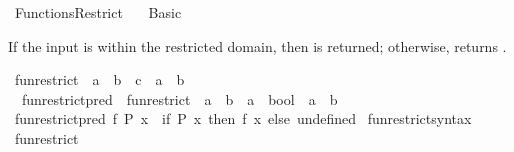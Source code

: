 %
\begin{isabellebody}%
%
%
\isadelimtheory
%
\endisadelimtheory
%
\isatagtheory
\isanewline
{}\isamarkupfalse%
\ Functions{\isacharunderscore}{\kern0pt}Restrict\isanewline
\ \ \ Basic\isanewline
{}%
\endisatagtheory
{\isafoldtheory}%
%
\isadelimtheory
%
\endisadelimtheory
%
\isadelimdocument
%
\endisadelimdocument
%
\isatagdocument
%
\isamarkuptrue%
%
\endisatagdocument
{\isafolddocument}%
%
\isadelimdocument
%
\endisadelimdocument
%
\begin{isamarkuptext}%
If the input  is within the restricted domain, then  is returned; otherwise, 
returns .%
\end{isamarkuptext}\isamarkuptrue%
\isamarkupfalse%
\ fun{\isacharunderscore}{\kern0pt}restrict\ {\isacharcolon}{\kern0pt}{\isacharcolon}{\kern0pt}\ {\isachardoublequoteopen}{\isacharparenleft}{\kern0pt}{\isacharprime}{\kern0pt}a\ {\isasymRightarrow}\ {\isacharprime}{\kern0pt}b{\isacharparenright}{\kern0pt}\ {\isasymRightarrow}\ {\isacharprime}{\kern0pt}c\ {\isasymRightarrow}\ {\isacharprime}{\kern0pt}a\ {\isasymRightarrow}\ {\isacharprime}{\kern0pt}b{\isachardoublequoteclose}\isanewline
\isanewline
{}\isamarkupfalse%
\isanewline
\ \ fun{\isacharunderscore}{\kern0pt}restrict{\isacharunderscore}{\kern0pt}pred\ {\isasymequiv}\ {\isachardoublequoteopen}fun{\isacharunderscore}{\kern0pt}restrict\ {\isacharcolon}{\kern0pt}{\isacharcolon}{\kern0pt}\ {\isacharparenleft}{\kern0pt}{\isacharprime}{\kern0pt}a\ {\isasymRightarrow}\ {\isacharprime}{\kern0pt}b{\isacharparenright}{\kern0pt}\ {\isasymRightarrow}\ {\isacharparenleft}{\kern0pt}{\isacharprime}{\kern0pt}a\ {\isasymRightarrow}\ bool{\isacharparenright}{\kern0pt}\ {\isasymRightarrow}\ {\isacharprime}{\kern0pt}a\ {\isasymRightarrow}\ {\isacharprime}{\kern0pt}b{\isachardoublequoteclose}\isanewline
{}\isanewline
\ \ \isamarkupfalse%
\ {\isachardoublequoteopen}fun{\isacharunderscore}{\kern0pt}restrict{\isacharunderscore}{\kern0pt}pred\ f\ P\ x\ {\isasymequiv}\ if\ P\ x\ then\ f\ x\ else\ undefined{\isachardoublequoteclose}\isanewline
{}\isamarkupfalse%
\isanewline
\isanewline
{}\isamarkupfalse%
\ fun{\isacharunderscore}{\kern0pt}restrict{\isacharunderscore}{\kern0pt}syntax\isanewline
{}\isanewline
{}\isamarkupfalse%
\ fun{\isacharunderscore}{\kern0pt}restrict\ {\isacharparenleft}{\kern0pt}{\isachardoublequoteopen}{\isacharparenleft}{\kern0pt}{\isacharunderscore}{\kern0pt}{\isacharparenright}{\kern0pt}{\isasymrestriction}{\isacharparenleft}{\kern0pt}\isactrlbsub {\isacharunderscore}{\kern0pt}\isactrlesub {\isacharparenright}{\kern0pt}{\isachardoublequoteclose}\ {\isacharbrackleft}{\kern0pt}{}{}{}{}{\isacharbrackright}{\kern0pt}{\isacharparenright}{\kern0pt}\isanewline

\end{isabellebody}
